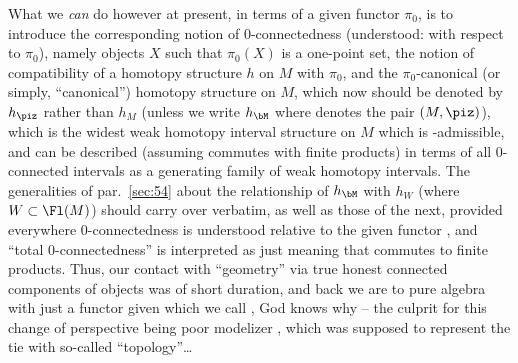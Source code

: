 What we \emph{can} do however at present, in terms of a
given functor $\pi_0$, is to introduce the corresponding notion of
$0$-connectedness (understood: with respect to $\pi_0$), namely
objects $X$ such that $\pi_0(X)$ is a one-point set, the notion of
compatibility of a homotopy structure $h$ on $M$ with $\pi_0$, and the
$\pi_0$-canonical (or simply, ``canonical'') homotopy structure on
$M$, which now should be denoted by $h_\piz$ rather than $h_M$ (unless
we write $h_\bM$ where \bM{} denotes the pair $(M,\piz)$), which is
the widest weak homotopy interval structure on $M$ which is
\piz-admissible, and can be described (assuming \piz{} commutes with
finite products) in terms of all $0$-connected intervals as a
generating family of weak homotopy intervals. The generalities of
par.\ \ref{sec:54} about the relationship of $h_\bM$ with $h_W$ (where
$W\subset\Fl(M)$) should carry over verbatim, as well as those of the
next, provided everywhere $0$-connectedness is understood relative to
the given functor \piz, and ``total $0$-connectedness'' is interpreted
as just meaning that \piz{} commutes to finite products. Thus, our
contact with ``geometry'' via true honest connected components of
objects was of short duration, and back we are to pure algebra with
just a functor given which we call \piz{}, God knows why -- the culprit
for this change of perspective being poor modelizer \Spaces, which was
supposed to represent the tie with so-called ``topology''\ldots

